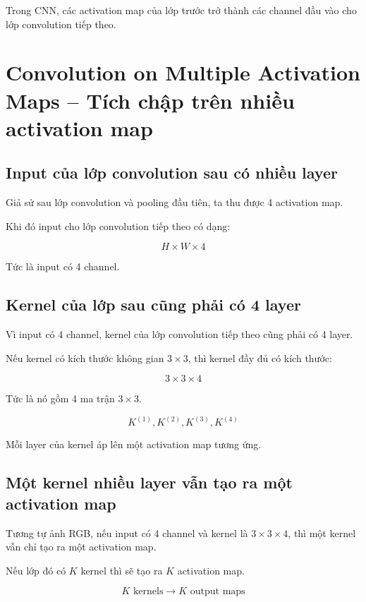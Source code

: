 \begin{ghinho}
Trong CNN, các activation map của lớp trước trở thành các channel đầu vào cho lớp convolution tiếp theo.
\end{ghinho}

\section{Convolution on Multiple Activation Maps -- Tích chập trên nhiều activation map}

\subsection{Input của lớp convolution sau có nhiều layer}

Giả sử sau lớp convolution và pooling đầu tiên, ta thu được 4 activation map.

Khi đó input cho lớp convolution tiếp theo có dạng:

\[
    H \times W \times 4
\]

Tức là input có 4 channel.

\subsection{Kernel của lớp sau cũng phải có 4 layer}

Vì input có 4 channel, kernel của lớp convolution tiếp theo cũng phải có 4 layer.

Nếu kernel có kích thước không gian $3\times3$, thì kernel đầy đủ có kích thước:

\[
    3\times3\times4
\]

Tức là nó gồm 4 ma trận $3\times3$.

\[
    K^{(1)}, K^{(2)}, K^{(3)}, K^{(4)}
\]

Mỗi layer của kernel áp lên một activation map tương ứng.

\subsection{Một kernel nhiều layer vẫn tạo ra một activation map}

Tương tự ảnh RGB, nếu input có 4 channel và kernel là $3\times3\times4$, thì một kernel vẫn chỉ tạo ra một activation map.

Nếu lớp đó có $K$ kernel thì sẽ tạo ra $K$ activation map.

\[
    K \text{ kernels}
    \rightarrow
    K \text{ output maps}
\]

